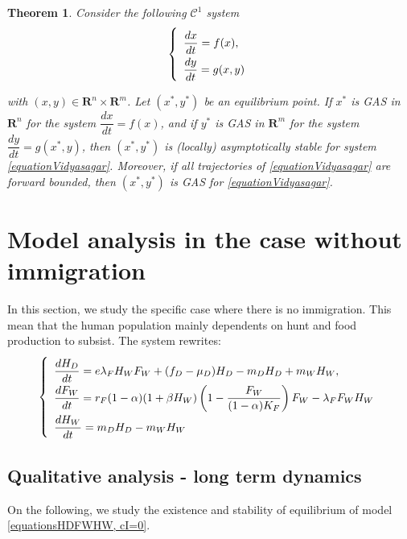 \documentclass{article}
\newcommand{\lfw}{\lambda_{F}}
\newcommand{\lfw}{\lambda_{F}}
\newtheorem{theorem}{Theorem}
\begin{document}
\begin{theorem}\label{theoremVidyasagar} \cite{vidyasagar_decomposition_1980, dumont_mathematical_2012}
Consider the following $\mathcal{C}^1$ system
\begin{equation}
\def\arraystretch{2}
\left\{ \begin{array}{l}
\dfrac{dx}{dt} = f(x), \\
\dfrac{dy}{dt} = g(x, y) 
\end{array} \right.
\label{equationVidyasagar}
\end{equation}

with $(x, y) \in \mathbf{R}^n \times\mathbf{R}^m$. Let $(x^*, y^*)$ be an equilibrium point.
If $x^*$ is GAS in $\mathbf{R}^n$ for the system $\dfrac{dx}{dt} = f(x)$, and if $y^*$ is GAS in $\mathbf{R}^m$ for the system $\dfrac{dy}{dt} = g(x^*, y)$, then $(x^*, y^*)$ is (locally) asymptotically stable for system \eqref{equationVidyasagar}. Moreover, if all trajectories of \eqref{equationVidyasagar} are forward bounded, then $(x^*, y^*)$ is GAS for \eqref{equationVidyasagar}.
\end{theorem}

\section{Model analysis in the case without immigration}
In this section, we study the specific case where there is no immigration. This mean that the human population mainly dependents on hunt and food production to subsist. The system rewrites:
\begin{equation}
\def\arraystretch{2}
\left\{ \begin{array}{l}
\dfrac{dH_D}{dt}= e\lfw H_W F_W + (f_D - \mu_D) H_D - m_D H_D + m_W H_W, \\
\dfrac{dF_W}{dt} = r_F(1- \alpha) (1+ \beta H_W) \left(1 - \dfrac{F_W}{(1-\alpha)K_F} \right) F_W - \lfw F_W H_W \\
\dfrac{dH_W}{dt}= m_D H_D - m_W H_W 
\end{array} \right.
\label{equationsHDFWHW, cI=0}
\end{equation}


\subsection{Qualitative analysis - long term dynamics}
On the following, we study the existence and stability of equilibrium of model \eqref{equationsHDFWHW, cI=0}. 
\end{document}
